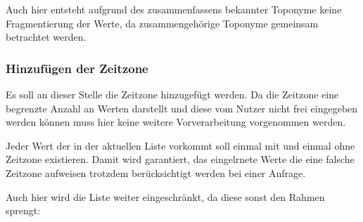 				Auch hier entsteht aufgrund des zusammenfassens bekannter Toponyme keine Fragmentierung der Werte, da zusammengehörige Toponyme gemeinsam betrachtet werden.

			\subsubsection{Hinzufügen der Zeitzone}

				Es soll an dieser Stelle die Zeitzone hinzugefügt werden.
				Da die Zeitzone eine begrenzte Anzahl an Werten darstellt und diese vom Nutzer nicht frei eingegeben werden können muss hier keine weitere Vorverarbeitung vorgenommen werden.

				Jeder Wert der in der aktuellen Liste vorkommt soll einmal mit und einmal ohne Zeitzone existieren. 
				Damit wird garantiert, das eingelrnete Werte die eine falsche Zeitzone aufweisen trotzdem berücksichtigt werden bei einer Anfrage. 

				Auch hier wird die Liste weiter eingeschränkt, da diese sonst den Rahmen sprengt:



